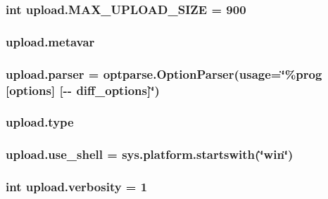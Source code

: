 \subsubsection[{\texorpdfstring{M\+A\+X\+\_\+\+U\+P\+L\+O\+A\+D\+\_\+\+S\+I\+ZE}{MAX_UPLOAD_SIZE}}]{\setlength{\rightskip}{0pt plus 5cm}int upload.\+M\+A\+X\+\_\+\+U\+P\+L\+O\+A\+D\+\_\+\+S\+I\+ZE = 900}\hypertarget{namespaceupload_aad5b1a43823e2a710a2f78e33dde8901}{}\label{namespaceupload_aad5b1a43823e2a710a2f78e33dde8901}
\subsubsection[{\texorpdfstring{metavar}{metavar}}]{\setlength{\rightskip}{0pt plus 5cm}upload.\+metavar}\hypertarget{namespaceupload_af1cea8af5389f0ab2d8b65b2c0fd2fe0}{}\label{namespaceupload_af1cea8af5389f0ab2d8b65b2c0fd2fe0}
\subsubsection[{\texorpdfstring{parser}{parser}}]{\setlength{\rightskip}{0pt plus 5cm}upload.\+parser = optparse.\+Option\+Parser(usage=\char`\"{}\%prog \mbox{[}options\mbox{]} \mbox{[}-\/-\/ diff\+\_\+options\mbox{]}\char`\"{})}\hypertarget{namespaceupload_af9e508d19dc2dd9cdb7c642dde0bdd21}{}\label{namespaceupload_af9e508d19dc2dd9cdb7c642dde0bdd21}
\subsubsection[{\texorpdfstring{type}{type}}]{\setlength{\rightskip}{0pt plus 5cm}upload.\+type}\hypertarget{namespaceupload_a4fc56f0dd6613be15c3c4dc3af3619ce}{}\label{namespaceupload_a4fc56f0dd6613be15c3c4dc3af3619ce}
\subsubsection[{\texorpdfstring{use\+\_\+shell}{use_shell}}]{\setlength{\rightskip}{0pt plus 5cm}upload.\+use\+\_\+shell = sys.\+platform.\+startswith(\char`\"{}win\char`\"{})}\hypertarget{namespaceupload_afa85ceef00a65cd276a856404eb5f310}{}\label{namespaceupload_afa85ceef00a65cd276a856404eb5f310}
\subsubsection[{\texorpdfstring{verbosity}{verbosity}}]{\setlength{\rightskip}{0pt plus 5cm}int upload.\+verbosity = 1}\hypertarget{namespaceupload_a79aff46409a98c4e5f608c8df1fd4612}{}\label{namespaceupload_a79aff46409a98c4e5f608c8df1fd4612}

